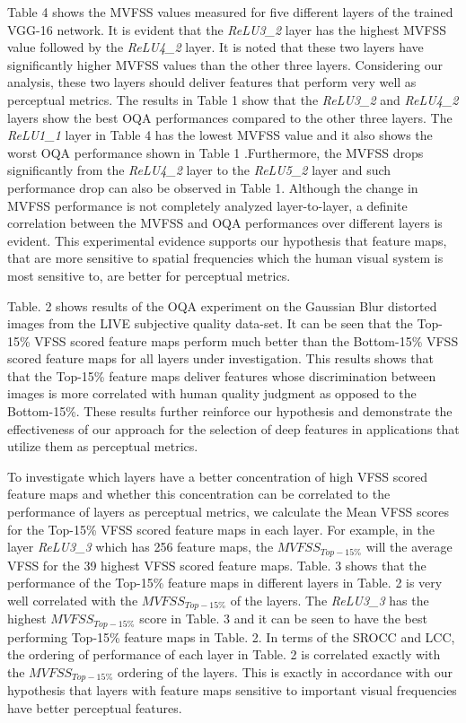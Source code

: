 \documentclass[10pt,twocolumn,letterpaper]{article}
\begin{document}
Table 4 shows the MVFSS values measured for five different layers of the trained VGG-16 network. It is evident that the \textit{ReLU3\_2} layer has the highest MVFSS value followed by the \textit{ReLU4\_2} layer. It is noted that these two layers have significantly higher MVFSS values than the other three layers. Considering our analysis, these two layers should deliver features that perform very well as perceptual metrics. The results in Table 1 show that the \textit{ReLU3\_2} and \textit{ReLU4\_2} layers show the best OQA performances compared to the other three layers. The \textit{ReLU1\_1} layer in Table 4 has the lowest MVFSS value and it also shows the worst OQA performance shown in Table 1 .Furthermore, the MVFSS drops significantly from the \textit{ReLU4\_2} layer to the \textit{ReLU5\_2} layer and such performance drop can also be observed in Table 1. Although the change in MVFSS performance is not completely analyzed layer-to-layer, a definite correlation between the MVFSS and OQA performances over different layers is evident. This experimental evidence supports our hypothesis that feature maps, that are more sensitive to spatial frequencies which the human visual system is most sensitive to, are better for perceptual metrics.

Table. 2 shows results of the OQA experiment on the Gaussian Blur distorted images from the LIVE subjective quality data-set. It can be seen that the Top-15\% VFSS scored feature maps perform much better than the Bottom-15\% VFSS scored feature maps for all layers under investigation. This results shows that that the Top-15\% feature maps deliver features whose discrimination between images is more correlated with human quality judgment as opposed to the Bottom-15\%. These results further reinforce our hypothesis and demonstrate the effectiveness of our approach for the selection of deep features in applications that utilize them as perceptual metrics.

To investigate which layers have a better concentration of high VFSS scored feature maps and whether this concentration can be correlated to the performance of layers as perceptual metrics, we calculate the Mean VFSS scores for the Top-15\% VFSS scored feature maps in each layer. For example, in the layer \textit{ReLU3\_3} which has 256 feature maps, the $MVFSS_{Top-15\%}$ will the average VFSS for the 39 highest VFSS scored feature maps. Table. 3 shows that the performance of the Top-15\% feature maps in different layers in Table. 2 is very well correlated with the $MVFSS_{Top-15\%}$ of the layers. The \textit{ReLU3\_3} has the highest $MVFSS_{Top-15\%}$ score in Table. 3 and it can be seen to have the best performing Top-15\% feature maps in Table. 2. In terms of the SROCC and LCC, the ordering of performance of each layer in Table. 2 is correlated exactly with the $MVFSS_{Top-15\%}$ ordering of the layers. This is exactly in accordance with our hypothesis that layers with feature maps sensitive to important visual frequencies have better perceptual features.
\end{document}
